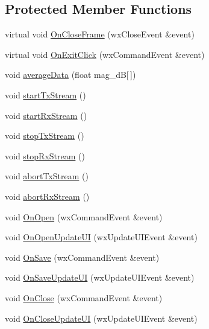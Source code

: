 \subsection*{Protected Member Functions}
\begin{DoxyCompactItemize}
\item 
virtual void \hyperlink{class_main_frame_ad96135c590b5739d8982b45a4778424e}{On\-Close\-Frame} (wx\-Close\-Event \&event)
\item 
virtual void \hyperlink{class_main_frame_ab9ed8ca71402b68b41fd5a7cedb20928}{On\-Exit\-Click} (wx\-Command\-Event \&event)
\item 
void \hyperlink{class_main_frame_a31585b905eee875973b106f4e79c263f}{average\-Data} (float mag\-\_\-d\-B\mbox{[}$\,$\mbox{]})
\item 
void \hyperlink{class_main_frame_af01eb2c59f1a9bcee0b956f8a72004c0}{start\-Tx\-Stream} ()
\item 
void \hyperlink{class_main_frame_ad17245c1c9c295fc216fc6615f31e0a5}{start\-Rx\-Stream} ()
\item 
void \hyperlink{class_main_frame_a9c5b263953c6703f0e721ba5694391f4}{stop\-Tx\-Stream} ()
\item 
void \hyperlink{class_main_frame_a91b813d6f6fc4c3777e332b018999a8d}{stop\-Rx\-Stream} ()
\item 
void \hyperlink{class_main_frame_abbe36f1aac14dba091ab0ec0c6ef2936}{abort\-Tx\-Stream} ()
\item 
void \hyperlink{class_main_frame_a44e48d93613d91be1db586553466feac}{abort\-Rx\-Stream} ()
\item 
void \hyperlink{class_main_frame_aabe1bcb0b9f62cd0f7578456a05099ee}{On\-Open} (wx\-Command\-Event \&event)
\item 
void \hyperlink{class_main_frame_ad81168bd08750269977d4c1d7bd42477}{On\-Open\-Update\-U\-I} (wx\-Update\-U\-I\-Event \&event)
\item 
void \hyperlink{class_main_frame_a78af6a47c864028ec8855cdd3f08c027}{On\-Save} (wx\-Command\-Event \&event)
\item 
void \hyperlink{class_main_frame_a5160647848d288c9e750807f6237158a}{On\-Save\-Update\-U\-I} (wx\-Update\-U\-I\-Event \&event)
\item 
void \hyperlink{class_main_frame_a22a222bc2e78f162e63113282fe7b008}{On\-Close} (wx\-Command\-Event \&event)
\item 
void \hyperlink{class_main_frame_aa5c50eabdeda94f98d2a820022dc5c7d}{On\-Close\-Update\-U\-I} (wx\-Update\-U\-I\-Event \&event)
\item 

\end{DoxyCompactItemize}
